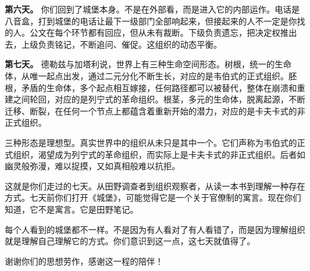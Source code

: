 \documentclass[12pt,a4paper]{article}
\begin{document}
\textbf{第六天。} 你们回到了城堡本身。不是在外部看，而是进入它的内部运作。电话是八音盒，打到城堡的电话让最下一级部门全部响起来，但接起来的人不一定是你找的人。公文在每个环节都有回应，但从未有裁断。下级负责遗忘，把决定权推出去，上级负责铭记，不断追问、催促。这组织的动态平衡。



\textbf{第七天。} 德勒兹与加塔利说，世界上有三种生命空间形态。树根，统一的生命体，从唯一起点出发，通过二元分化不断生长，对应的是韦伯式的正式组织。胚根，矛盾的生命体，多个起点相互嫁接，任何路径都可以被替代，整体在崩溃和重建之间轮回，对应的是列宁式的革命组织。根茎，多元的生命体，脱离起源，不断迁移、断裂，在任何一个节点上都蕴含着重新开始的潜力，对应的是卡夫卡式的非正式组织。



三种形态是理想型。真实世界中的组织从未只是其中一个。它们声称为韦伯式的正式组织，渴望成为列宁式的革命组织，而实际上是卡夫卡式的非正式组织。后者如幽灵般弥漫，难以捉摸，又如真相般难以抗拒。



这就是你们走过的七天。从田野调查者到组织观察者，从读一本书到理解一种存在方式。七天前你们打开《城堡》，可能觉得它是一个关于官僚制的寓言。现在你们知道，它不是寓言。它是田野笔记。



每个人看到的城堡都不一样。不是因为有人看对了有人看错了，而是因为理解组织就是理解自己理解它的方式。你们意识到这一点，这七天就值得了。



谢谢你们的思想劳作，感谢这一程的陪伴！
\end{document}
